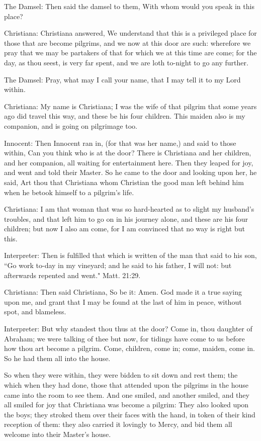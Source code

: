 The Damsel: Then said the damsel to them, With whom would you speak in this place?

Christiana: Christiana answered, We understand that this is a privileged place for those that are become pilgrims, and we now at this door are such: wherefore we pray that we may be partakers of that for which we at this time are come; for the day, as thou seest, is very far spent, and we are loth to-night to go any further.

The Damsel: Pray, what may I call your name, that I may tell it to my Lord within.

Christiana: My name is Christiana; I was the wife of that pilgrim that some years ago did travel this way, and these be his four children. This maiden also is my companion, and is going on pilgrimage too.

Innocent: Then Innocent ran in, (for that was her name,) and said to those within, Can you think who is at the door? There is Christiana and her children, and her companion, all waiting for entertainment here. Then they leaped for joy, and went and told their Master. So he came to the door and looking upon her, he said, Art thou that Christiana whom Christian the good man left behind him when he betook himself to a pilgrim's life.

Christiana: I am that woman that was so hard-hearted as to slight my husband's troubles, and that left him to go on in his journey alone, and these are his four children; but now I also am come, for I am convinced that no way is right but this.

Interpreter: Then is fulfilled that which is written of the man that said to his son, ``Go work to-day in my vineyard; and he said to his father, I will not: but afterwards repented and went." Matt. 21:29.

Christiana: Then said Christiana, So be it: Amen. God made it a true saying upon me, and grant that I may be found at the last of him in peace, without spot, and blameless.

Interpreter: But why standest thou thus at the door? Come in, thou daughter of Abraham; we were talking of thee but now, for tidings have come to us before how thou art become a pilgrim. Come, children, come in; come, maiden, come in. So he had them all into the house.

So when they were within, they were bidden to sit down and rest them; the which when they had done, those that attended upon the pilgrims in the house came into the room to see them. And one smiled, and another smiled, and they all smiled for joy that Christiana was become a pilgrim: They also looked upon the boys; they stroked them over their faces with the hand, in token of their kind reception of them: they also carried it lovingly to Mercy, and bid them all welcome into their Master's house.


